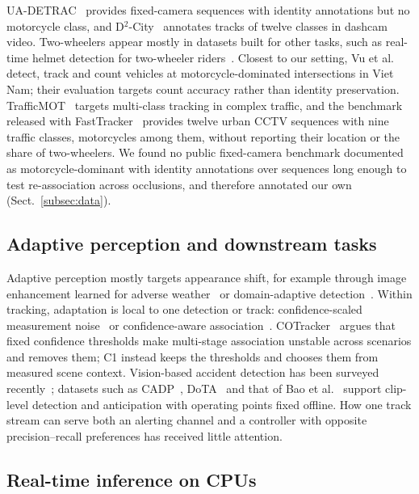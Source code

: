 \documentclass[twocolumn]{svjour3}
\begin{document}
UA-DETRAC~\cite{Wen2020_uadetrac} provides fixed-camera sequences with identity
annotations but no motorcycle class, and D$^2$-City~\cite{Che2019_d2city}
annotates tracks of twelve classes in dashcam video. Two-wheelers appear mostly
in datasets built for other tasks, such as real-time helmet detection for
two-wheeler riders~\cite{An2026_rspvyolo}. Closest to our setting, Vu et
al.~\cite{Vu2025_counting} detect, track and count vehicles at
motorcycle-dominated intersections in Viet Nam; their evaluation targets count
accuracy rather than identity preservation. TrafficMOT~\cite{Liu2024_trafficmot}
targets multi-class tracking in complex traffic, and the benchmark released with
FastTracker~\cite{Hashempoor2025_fasttracker} provides twelve urban CCTV
sequences with nine traffic classes, motorcycles among them, without reporting
their location or the share of two-wheelers. We found no public fixed-camera
benchmark documented as motorcycle-dominant with identity annotations over
sequences long enough to test re-association across occlusions, and therefore
annotated our own (Sect.~\ref{subsec:data}).

\subsection{Adaptive perception and downstream tasks}\label{subsec:rw_adaptive}

Adaptive perception mostly targets appearance shift, for example through
image enhancement learned for adverse weather~\cite{Liu2022_iayolo} or
domain-adaptive detection~\cite{Chen2018_dafrcnn}. Within tracking, adaptation is local to one
detection or track: confidence-scaled measurement
noise~\cite{Du2021_giaotracker,Du2023_strongsort} or confidence-aware
association~\cite{Yang2024_hybridsort,Liu2024_cotracker}.
COTracker~\cite{Liu2024_cotracker} argues that fixed confidence thresholds make
multi-stage association unstable across scenarios and removes them; C1 instead
keeps the thresholds and chooses them from measured scene context. Vision-based
accident detection has been surveyed recently~\cite{Fang2024_accidentsurvey};
datasets such as CADP~\cite{Shah2018_cadp}, DoTA~\cite{Yao2023_dota} and that of
Bao et al.~\cite{Bao2020_ccd} support clip-level detection and anticipation with
operating points fixed offline. How one track stream can serve both an alerting
channel and a controller with opposite precision--recall preferences has
received little attention.

\subsection{Real-time inference on CPUs}\label{subsec:rw_realtime}
\end{document}
